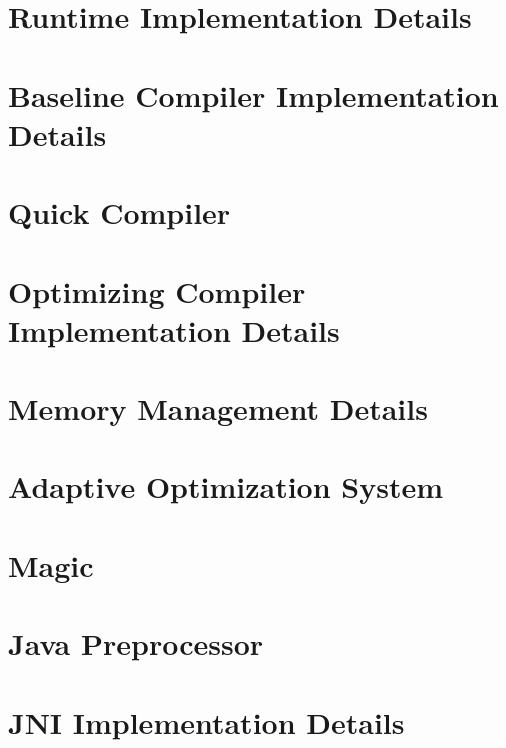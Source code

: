 \documentclass{article}
\begin{document}
\T \newpage
{}
\section{Runtime Implementation Details}


\T \newpage
{}
\section{Baseline Compiler Implementation Details}
\label{section:basedetails}


\T \newpage
{}
\section{Quick Compiler}
\label{section:quick}


\T \newpage
{}
\section{Optimizing Compiler Implementation Details}
\label{section:optdetails}


\T \newpage
{}
\section{Memory Management Details}
\label{section:MMTk}


\T \newpage
{}
\section{Adaptive Optimization System}
\label{section:aosdetails}


\T \newpage
{}
\section{Magic}


\T \newpage
{}
\section{Java Preprocessor}
\label{section:preprocessor}


\T \newpage
{}
\section{JNI Implementation Details}
\label{section:jni}

\end{document}
